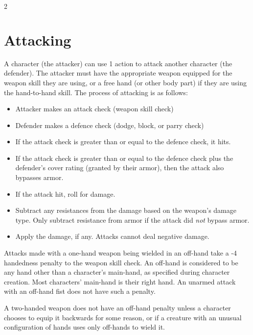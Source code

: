 \begin{multicols*}{2}
    \section{Attacking}\label{combat:attacking}
    A character (the attacker) can use 1 action to attack another character
    (the defender). The attacker must have the appropriate weapon equipped
    for the weapon skill they are using, or a free hand (or other body part)
    if they are using the hand-to-hand skill. The process of attacking is as
    follows:
    \begin{itemize}
        \item Attacker makes an attack check (weapon skill check)
        \item Defender makes a defence check (dodge, block, or parry check)
        \item If the attack check is greater than or equal to the defence
            check, it hits.
        \item If the attack check is greater than or equal to the defence check
            plus the defender's cover rating (granted by
            their armor), then the attack also bypasses armor.
        \item If the attack hit, roll for damage.
        \item Subtract any resistances from the damage based
            on the weapon's damage type. Only subtract resistance from armor
            if the attack did \textit{not} bypass armor.
        \item Apply the damage, if any. Attacks cannot deal negative damage.
    \end{itemize}

    Attacks made with a one-hand weapon being wielded in an off-hand take a -4
    handedness penalty to the weapon skill check. An off-hand is considered to
    be any hand other than a character's main-hand, as specified during
    character creation. Most characters' main-hand is their right hand.
    An unarmed attack with an off-hand fist does not have such a penalty.

    A two-handed weapon does not have an off-hand penalty unless a character
    chooses to equip it backwards for some reason, or if a creature with an
    unusual configuration of hands uses only off-hands to wield it.



\end{multicols*}
